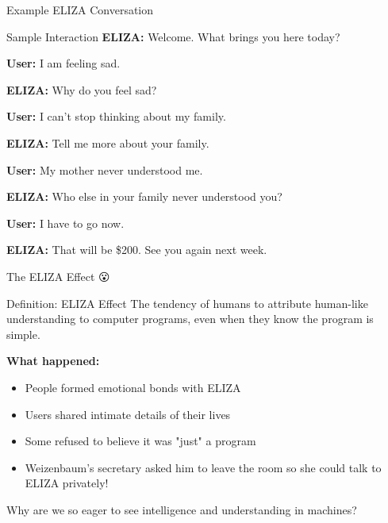 \documentclass[aspectratio=169]{beamer}
\begin{document}
\begin{frame}{Example ELIZA Conversation 💬}
\begin{block}{Sample Interaction}
\textbf{ELIZA:} Welcome. What brings you here today?

\textbf{User:} I am feeling sad.

\textbf{ELIZA:} Why do you feel sad?

\textbf{User:} I can't stop thinking about my family.

\textbf{ELIZA:} Tell me more about your family.

\textbf{User:} My mother never understood me.

\textbf{ELIZA:} Who else in your family never understood you?

\textbf{User:} I have to go now.

\textbf{ELIZA:} That will be \$200. See you again next week.
\end{block}
\end{frame}

\begin{frame}{The ELIZA Effect 😮}
\small
\begin{block}{Definition: ELIZA Effect}
The tendency of humans to attribute human-like understanding to computer programs, even when they know the program is simple.
\end{block}

\vspace{0.3cm}

\textbf{What happened:}
\begin{itemize}\setlength{\itemsep}{0pt}
    \item People formed emotional bonds with ELIZA
    \item Users shared intimate details of their lives
    \item Some refused to believe it was "just" a program
    \item Weizenbaum's secretary asked him to leave the room so she could talk to ELIZA privately!
\end{itemize}

\vspace{0.3cm}

\begin{thinkaboutit}
Why are we so eager to see intelligence and understanding in machines?
\end{thinkaboutit}
\end{frame}
\end{document}
